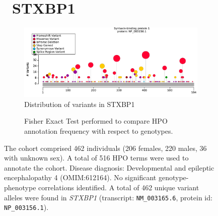 \begin{figure}[htbp]
\section*{ STXBP1}
\centering
\begin{subfigure}[b]{0.95\textwidth}
\centering
\includegraphics[width=\textwidth]{ img/STXBP1_protein_diagram.pdf} 
\captionsetup{justification=raggedright,singlelinecheck=false}
\caption{Distribution of variants in STXBP1}
\end{subfigure}

\vspace{2em}

\begin{subfigure}[b]{0.95\textwidth}
\centering
{}
\captionsetup{justification=raggedright,singlelinecheck=false}
\caption{Fisher Exact Test performed to compare HPO annotation frequency with respect to genotypes. }
\end{subfigure}

\vspace{2em}

\caption{ The cohort comprised 462 individuals (206 females, 220 males, 36 with unknown sex). A total of 516 HPO terms were used to annotate the cohort. Disease diagnosis: Developmental and epileptic encephalopathy 4 (OMIM:612164). No significant genotype-phenotype correlations identified. A total of 462 unique variant alleles were found in \textit{STXBP1} (transcript: \texttt{NM\_003165.6}, protein id: \texttt{NP\_003156.1}).}
\end{figure}
